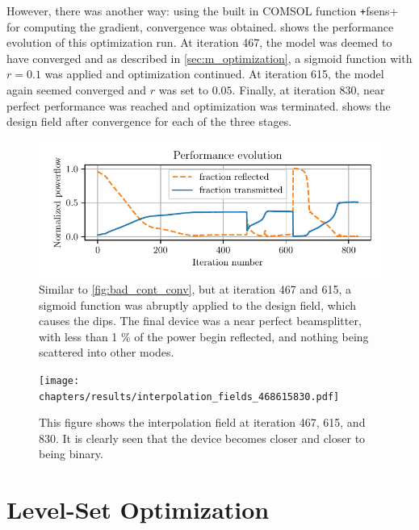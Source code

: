 However, there was another way:
using the built in COMSOL function \texttt+fsens+ for computing
the gradient, convergence was obtained.
 shows the performance evolution of this optimization run.
At iteration 467, the model was deemed to have converged and as described in
\cref{sec:m_optimization}, a sigmoid function with $r=0.1$ was applied and optimization
continued.
At iteration 615, the model again seemed converged and $r$ was set to $0.05$.
Finally, at iteration 830, near perfect performance was reached and optimization
was terminated.
 shows the design field after convergence for each of the
three stages.

\begin{figure}[htpb]
	\centering
	\includegraphics{chapters/results/conv_31.pdf}
	\caption{%
		Similar to \cref{fig:bad_cont_conv},
		but at iteration 467 and 615, a sigmoid function was abruptly applied
		to the design field, which causes the dips.
		The final device was a near perfect beamsplitter, with less than 1 \% of
		the power begin reflected, and nothing being scattered into other modes.
	}%
	\label{fig:cont_conv1}
\end{figure}

\begin{figure}[htpb]
	\centering
	\texttt{[image: chapters/results/interpolation\_fields\_468615830.pdf]}
	\caption{%
		This figure shows the interpolation field at iteration 467, 615,
		and 830. It is clearly seen that the device becomes closer and closer to
		being binary.
	}%
	\label{fig:cont_design1}
\end{figure}

\section{Level-Set Optimization}\label{sec:res_bin}

